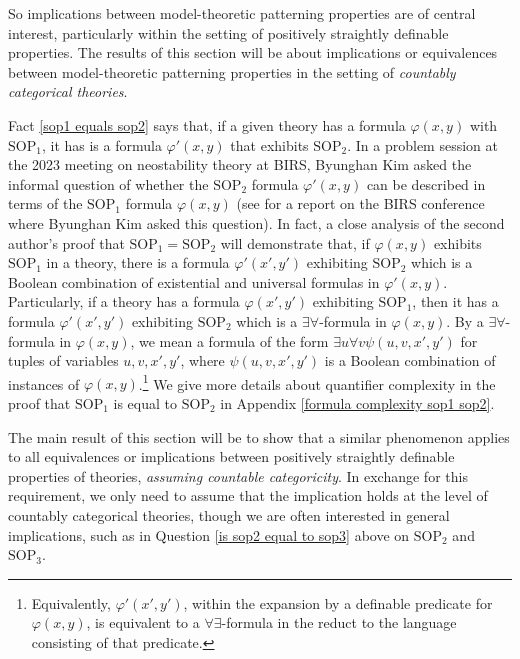 \documentclass{article}
\theoremstyle{definition}
\theoremstyle{definition}
\theoremstyle{definition}
\begin{document}
So implications between model-theoretic patterning properties are of central interest, particularly within the setting of positively straightly definable properties. The results of this section will be about implications or equivalences between model-theoretic patterning properties in the setting of \textit{countably categorical theories}.


Fact \ref{sop1 equals sop2} says that, if a given theory has a formula $\varphi(x, y)$ with $\mathrm{SOP}_{1}$, it has is a formula $\varphi'(x, y)$ that exhibits $\mathrm{SOP}_{2}$. In a problem session at the 2023 meeting on neostability theory at BIRS, Byunghan Kim asked the informal question of whether the $\mathrm{SOP}_{2}$ formula $\varphi'(x, y)$ can be described in terms of the $\mathrm{SOP}_{1}$ formula $\varphi(x, y)$ (see \cite{BIRS23w5145} for a report on the BIRS conference where Byunghan Kim asked this question). In fact, a close analysis of the second author's proof that $\mathrm{SOP}_{1} = \mathrm{SOP}_{2}$ will demonstrate that, if $\varphi(x, y)$ exhibits $\mathrm{SOP}_{1}$ in a theory, there is a formula $\varphi'(x', y')$ exhibiting $\mathrm{SOP}_{2}$  which is a Boolean combination of existential and universal formulas in $\varphi'(x, y)$. Particularly, if a theory has a formula $\varphi(x', y')$ exhibiting $\mathrm{SOP}_{1}$, then it has a formula $\varphi'(x', y')$ exhibiting $\mathrm{SOP}_{2}$ which is a $\exists\forall$-formula in $\varphi(x, y)$. By a $\exists\forall$-formula in $\varphi(x, y)$, we mean a formula of the form $\exists u \forall v \psi(u, v, x', y')$ for tuples of variables $u, v, x', y'$, where $\psi(u, v, x', y')$ is a Boolean combination of instances of $\varphi(x, y)$.\footnote{Equivalently, $\varphi'(x', y')$, within the expansion by a definable predicate for $\varphi(x, y)$, is equivalent to a $\forall\exists$-formula in the reduct to the language consisting of that predicate.} We give more details about quantifier complexity in the proof that $\mathrm{SOP}_{1}$ is equal to $\mathrm{SOP}_{2}$ in Appendix \ref{formula complexity sop1 sop2}.


The main result of this section will be to show that a similar phenomenon applies to all equivalences or implications between positively straightly definable properties of theories, \textit{assuming countable categoricity}. In exchange for this requirement, we only need to assume that the implication holds at the level of countably categorical theories, though we are often interested in general implications, such as in Question \ref{is sop2 equal to sop3} above on $\mathrm{SOP}_{2}$ and $\mathrm{SOP}_{3}$.
\end{document}
